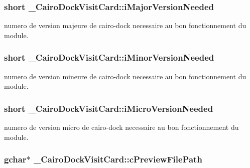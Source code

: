 \subsubsection{\setlength{\rightskip}{0pt plus 5cm}short {\bf \_\-CairoDockVisitCard::iMajorVersionNeeded}}\label{struct__CairoDockVisitCard_2eb94b4a94f50fd73dab9bba5f8cce9f}


numero de version majeure de cairo-dock necessaire au bon fonctionnement du module. 

\subsubsection{\setlength{\rightskip}{0pt plus 5cm}short {\bf \_\-CairoDockVisitCard::iMinorVersionNeeded}}\label{struct__CairoDockVisitCard_67321e0eaba4a436e9b52f291eb0dd8a}


numero de version mineure de cairo-dock necessaire au bon fonctionnement du module. 

\subsubsection{\setlength{\rightskip}{0pt plus 5cm}short {\bf \_\-CairoDockVisitCard::iMicroVersionNeeded}}\label{struct__CairoDockVisitCard_e5627bdce7225e6b50cd17d51bf1d8cc}


numero de version micro de cairo-dock necessaire au bon fonctionnement du module. 

\subsubsection{\setlength{\rightskip}{0pt plus 5cm}gchar$\ast$ {\bf \_\-CairoDockVisitCard::cPreviewFilePath}}\label{struct__CairoDockVisitCard_dd9afe6d2efddc609fb683b26f7b2c70}


